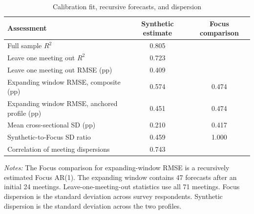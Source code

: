 \begin{table}[htbp]
\color{revisionred}
\centering
\begin{threeparttable}
\caption{Calibration fit, recursive forecasts, and dispersion}
\label{tab:focus-calibration-summary}
\begin{footnotesize}
\begin{tabular}{lcc}
\toprule
Assessment & Synthetic estimate & Focus comparison \\
\midrule
Full sample $R^2$ & 0.805 &  \\
Leave one meeting out $R^2$ & 0.723 &  \\
Leave one meeting out RMSE (pp) & 0.409 &  \\
\addlinespace
Expanding window RMSE, composite (pp) & 0.574 & 0.474 \\
Expanding window RMSE, anchored profile (pp) & 0.451 & 0.474 \\
\addlinespace
Mean cross-sectional SD (pp) & 0.210 & 0.417 \\
Synthetic-to-Focus SD ratio & 0.459 & 1.000 \\
Correlation of meeting dispersions & 0.743 &  \\
\bottomrule
\end{tabular}
\begin{tablenotes}[flushleft]
\scriptsize
\item \textit{Notes:} The Focus comparison for expanding-window RMSE is a recursively estimated Focus AR(1). The expanding window contains 47 forecasts after an initial 24 meetings. Leave-one-meeting-out statistics use all 71 meetings. Focus dispersion is the standard deviation across survey respondents. Synthetic dispersion is the standard deviation across the two profiles.
\end{tablenotes}
\end{footnotesize}
\end{threeparttable}
\end{table}
